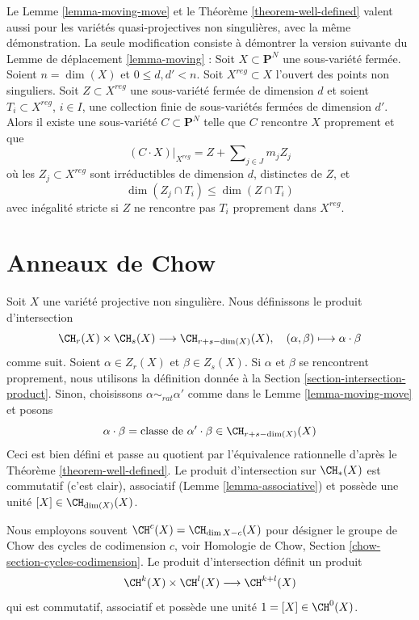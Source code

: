\begin{remark}
\label{remark-quasi-projective}
Le Lemme \ref{lemma-moving-move} et le
Théorème \ref{theorem-well-defined}
valent aussi pour les variétés quasi-projectives non singulières, avec
la même démonstration. La seule modification consiste à démontrer la version suivante
du Lemme de déplacement \ref{lemma-moving} : Soit  $X \subset \mathbf{P}^N$
une sous-variété fermée. Soient $n = \dim(X)$ et $0 \leq d, d' < n$. Soit
$X^{reg} \subset X$ l'ouvert des points non singuliers. Soit
$Z \subset X^{reg}$ une sous-variété fermée de dimension $d$ et soient
$T_i \subset X^{reg}$, $i \in I$, une collection finie de sous-variétés fermées
de dimension $d'$. Alors il existe une sous-variété $C \subset \mathbf{P}^N$
telle que $C$ rencontre $X$ proprement et que
$$
(C \cdot X)|_{X^{reg}} = Z + \sum\nolimits_{j \in J} m_j Z_j
$$
où les $Z_j \subset X^{reg}$ sont irréductibles de dimension $d$, distinctes
de $Z$, et
$$
\dim(Z_j \cap T_i) \leq \dim(Z \cap T_i)
$$
avec inégalité stricte si $Z$ ne rencontre pas $T_i$ proprement dans $X^{reg}$.
\end{remark}



\section{Anneaux de Chow}
\label{section-chow-rings}

\noindent
Soit $X$ une variété projective non singulière. Nous définissons le produit
d'intersection
$$
\CH_r(X) \times \CH_s(X) \longrightarrow \CH_{r + s - \dim(X)}(X),\quad
(\alpha, \beta) \longmapsto \alpha \cdot \beta
$$
comme suit. Soient $\alpha \in Z_r(X)$ et $\beta \in Z_s(X)$.
Si $\alpha$ et $\beta$ se rencontrent proprement, nous utilisons la
définition donnée à la Section \ref{section-intersection-product}.
Sinon, choisissons $\alpha \sim_{rat} \alpha'$ comme dans le
Lemme \ref{lemma-moving-move} et posons
$$
\alpha \cdot \beta =
\text{classe de }\alpha' \cdot \beta \in \CH_{r + s - \dim(X)}(X)
$$
Ceci est bien défini et passe au quotient par l'équivalence rationnelle d'après le
Théorème \ref{theorem-well-defined}. Le produit d'intersection
sur $\CH_*(X)$ est commutatif (c'est clair), associatif
(Lemme \ref{lemma-associative}) et possède une unité $[X] \in \CH_{\dim(X)}(X)$.

\medskip\noindent
Nous employons souvent $\CH^c(X) = \CH_{\dim X - c}(X)$ pour désigner le groupe de Chow des
cycles de codimension $c$, voir
Homologie de Chow, Section \ref{chow-section-cycles-codimension}.
Le produit d'intersection définit un produit
$$
\CH^k(X) \times \CH^l(X) \longrightarrow \CH^{k + l}(X)
$$
qui est commutatif, associatif et possède une unité $1 = [X] \in \CH^0(X)$.


